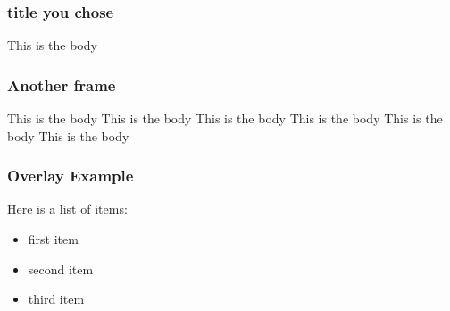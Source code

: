 \documentclass{beamer}
\begin{document}
\begin{frame}
\frametitle{title you chose}
This is the body
\end{frame}

\begin{frame}
\frametitle{Another frame}
This is the body
This is the body
This is the body
This is the body
This is the body
This is the body
\end{frame}

\begin{frame}
   \frametitle{Overlay Example}
   Here is a list of items:

   \begin{itemize}
   \item first item
   \pause
   \item second item
   \pause
   \item third item
   \pause
   \end{itemize}
\end{frame}
\end{document}
